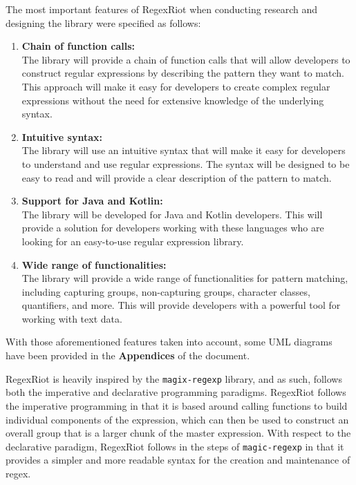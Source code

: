 \documentclass[conference]{IEEEtran}
\begin{document}
The most important features of RegexRiot when conducting research and
designing the library were specified as follows:

\begin{enumerate}
    \item \textbf{Chain of function calls:}\\
          The library will provide a chain of function calls that will allow developers
          to construct regular expressions by describing the pattern they want to match.
          This approach will make it easy for developers to create complex regular expressions
          without the need for extensive knowledge of the underlying syntax.

    \item \textbf{Intuitive syntax:}\\
          The library will use an intuitive syntax that will make it easy for developers
          to understand and use regular expressions. The syntax will be designed to be easy
          to read and will provide a clear description of the pattern to match.

    \item \textbf{Support for Java and Kotlin:}\\
          The library will be developed for Java and Kotlin developers. \cite{oracle_docs1997}
          This will provide a solution for developers working with these languages who are
          looking for an easy-to-use regular expression library.\cite{kotlin_docs2023}

          \vfill\eject

    \item \textbf{Wide range of functionalities:}\\
          The library will provide a wide range of functionalities for pattern matching,
          including capturing groups, non-capturing groups, character classes, quantifiers,
          and more. This will provide developers with a powerful tool for working with text data.
\end{enumerate}

With those aforementioned features taken into account,
some UML diagrams have been provided in the \textbf{Appendices} of the
document.

RegexRiot is heavily inspired by the \texttt{magix-regexp} library, and as such,
follows both the imperative and declarative programming paradigms. \cite{magic-regexp}
RegexRiot follows the imperative programming in that it is based around calling functions
to build individual components of the expression, which can then be used to construct an
overall group that is a larger chunk of the master expression. With respect to the
declarative paradigm, RegexRiot follows in the steps of \texttt{magic-regexp}
in that it provides a simpler and more readable syntax for the creation and
maintenance of regex.
\end{document}
